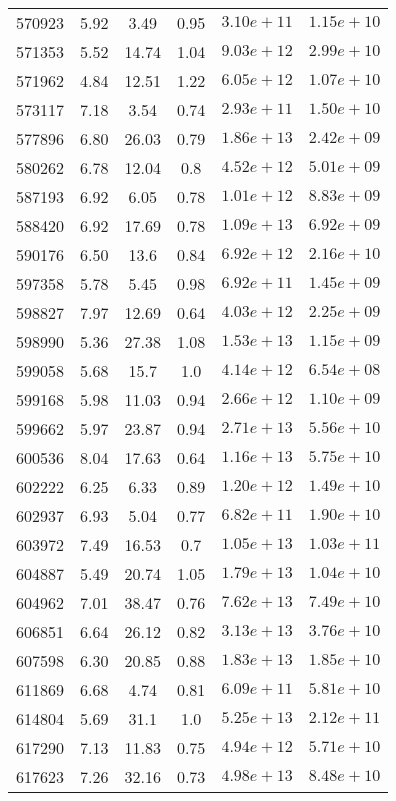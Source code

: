 \begin{table}
\begin{tabular}{cccccc}
570923 & 5.92 & 3.49 & 0.95 & $3.10e+11$ & $1.15e+10$ \\
571353 & 5.52 & 14.74 & 1.04 & $9.03e+12$ & $2.99e+10$ \\
571962 & 4.84 & 12.51 & 1.22 & $6.05e+12$ & $1.07e+10$ \\
573117 & 7.18 & 3.54 & 0.74 & $2.93e+11$ & $1.50e+10$ \\
577896 & 6.80 & 26.03 & 0.79 & $1.86e+13$ & $2.42e+09$ \\
580262 & 6.78 & 12.04 & 0.8 & $4.52e+12$ & $5.01e+09$ \\
587193 & 6.92 & 6.05 & 0.78 & $1.01e+12$ & $8.83e+09$ \\
588420 & 6.92 & 17.69 & 0.78 & $1.09e+13$ & $6.92e+09$ \\
590176 & 6.50 & 13.6 & 0.84 & $6.92e+12$ & $2.16e+10$ \\
597358 & 5.78 & 5.45 & 0.98 & $6.92e+11$ & $1.45e+09$ \\
598827 & 7.97 & 12.69 & 0.64 & $4.03e+12$ & $2.25e+09$ \\
598990 & 5.36 & 27.38 & 1.08 & $1.53e+13$ & $1.15e+09$ \\
599058 & 5.68 & 15.7 & 1.0 & $4.14e+12$ & $6.54e+08$ \\
599168 & 5.98 & 11.03 & 0.94 & $2.66e+12$ & $1.10e+09$ \\
599662 & 5.97 & 23.87 & 0.94 & $2.71e+13$ & $5.56e+10$ \\
600536 & 8.04 & 17.63 & 0.64 & $1.16e+13$ & $5.75e+10$ \\
602222 & 6.25 & 6.33 & 0.89 & $1.20e+12$ & $1.49e+10$ \\
602937 & 6.93 & 5.04 & 0.77 & $6.82e+11$ & $1.90e+10$ \\
603972 & 7.49 & 16.53 & 0.7 & $1.05e+13$ & $1.03e+11$ \\
604887 & 5.49 & 20.74 & 1.05 & $1.79e+13$ & $1.04e+10$ \\
604962 & 7.01 & 38.47 & 0.76 & $7.62e+13$ & $7.49e+10$ \\
606851 & 6.64 & 26.12 & 0.82 & $3.13e+13$ & $3.76e+10$ \\
607598 & 6.30 & 20.85 & 0.88 & $1.83e+13$ & $1.85e+10$ \\
611869 & 6.68 & 4.74 & 0.81 & $6.09e+11$ & $5.81e+10$ \\
614804 & 5.69 & 31.1 & 1.0 & $5.25e+13$ & $2.12e+11$ \\
617290 & 7.13 & 11.83 & 0.75 & $4.94e+12$ & $5.71e+10$ \\
617623 & 7.26 & 32.16 & 0.73 & $4.98e+13$ & $8.48e+10$ \\

\end{tabular}
\end{table}
